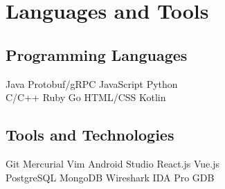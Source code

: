 \documentclass[]{template}
\begin{document}
\section{Languages and Tools}
\begin{minipage}[t]{.45\textwidth}
\subsection{Programming Languages}
Java
\textbullet{} Protobuf/gRPC
\textbullet{} JavaScript
\textbullet{} Python
\\ %
C/C++
\textbullet{} Ruby
\textbullet{} Go
\textbullet{} HTML/CSS
\textbullet{} Kotlin
\sectionsep
\end{minipage}
\hfill
\begin{minipage}[t]{.45\textwidth}
\subsection{Tools and Technologies}
Git
\textbullet{} Mercurial
\textbullet{} Vim
\textbullet{} Android Studio
\textbullet{} React.js
\textbullet{} Vue.js
\\ %
PostgreSQL
\textbullet{} MongoDB
\textbullet{} Wireshark
\textbullet{} IDA Pro
\textbullet{} GDB
\end{minipage}
\end{document}
